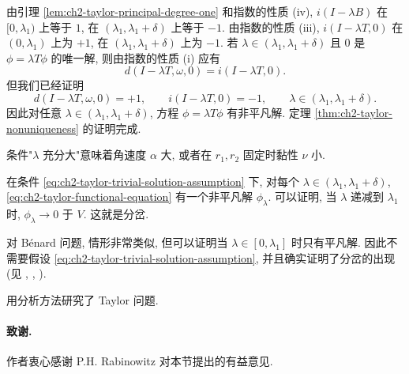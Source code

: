 \begin{Proof}
由引理 \ref{lem:ch2-taylor-principal-degree-one} 和指数的性质 (iv), $i(I-\lambda B)$ 在 $[0,\lambda_1)$ 上等于 $1$, 在 $(\lambda_1,\lambda_1+\delta)$ 上等于 $-1$. 由指数的性质 (iii), $i(I-\lambda T,0)$ 在 $(0,\lambda_1)$ 上为 $+1$, 在 $(\lambda_1,\lambda_1+\delta)$ 上为 $-1$. 若 $\lambda\in(\lambda_1,\lambda_1+\delta)$ 且 $0$ 是 $\phi=\lambda T\phi$ 的唯一解, 则由指数的性质 (i) 应有
\[
d(I-\lambda T,\omega,0)=i(I-\lambda T,0).
\]
但我们已经证明
\[
d(I-\lambda T,\omega,0)=+1,
\qquad
i(I-\lambda T,0)=-1,
\qquad
\lambda\in(\lambda_1,\lambda_1+\delta).
\]
因此对任意 $\lambda\in(\lambda_1,\lambda_1+\delta)$, 方程 $\phi=\lambda T\phi$ 有非平凡解. 定理 \ref{thm:ch2-taylor-nonuniqueness} 的证明完成.
\end{Proof}

\begin{Remark}
\label{rem:ch2-taylor-large-lambda-physical-meaning}
条件"$\lambda$ 充分大"意味着角速度 $\alpha$ 大, 或者在 $r_1,r_2$ 固定时黏性 $\nu$ 小.
\end{Remark}

\begin{Remark}
\label{rem:ch2-taylor-bifurcation}
在条件 \eqref{eq:ch2-taylor-trivial-solution-assumption} 下, 对每个 $\lambda\in(\lambda_1,\lambda_1+\delta)$, \eqref{eq:ch2-taylor-functional-equation} 有一个非平凡解 $\phi_\lambda$. 可以证明, 当 $\lambda$ 递减到 $\lambda_1$ 时, $\phi_\lambda\to0$ 于 $V$. 这就是分岔.
\end{Remark}

对 Bénard 问题, 情形非常类似, 但可以证明当 $\lambda\in[0,\lambda_1]$ 时只有平凡解. 因此不需要假设 \eqref{eq:ch2-taylor-trivial-solution-assumption}, 并且确实证明了分岔的出现(见 , , ).

 用分析方法研究了 Taylor 问题.

\paragraph{致谢.}
作者衷心感谢 P.H. Rabinowitz 对本节提出的有益意见.

\hypertarget{chapter-02-page-181}{}
